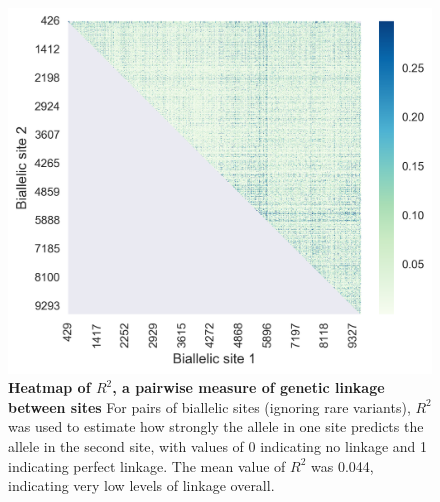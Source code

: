 \begin{figure}[ht!]
  \begin{centering}
    \includegraphics[width=.8\linewidth]{./png/siv_linkage.png}
  	\caption[Heatmap of $R^2$, a pairwise measure of genetic linkage between sites]{\textbf{Heatmap of $R^2$, a pairwise measure of genetic linkage between sites }
For pairs of biallelic sites (ignoring rare variants), $R^2$ was used to estimate how strongly the allele in one site predicts the allele in the second site, with values of 0 indicating no linkage and 1 indicating perfect linkage.
The mean value of $R^2$ was 0.044, indicating very low levels of linkage overall.
        }
  	\label{siv_linkage}
  \end{centering}
\end{figure}

